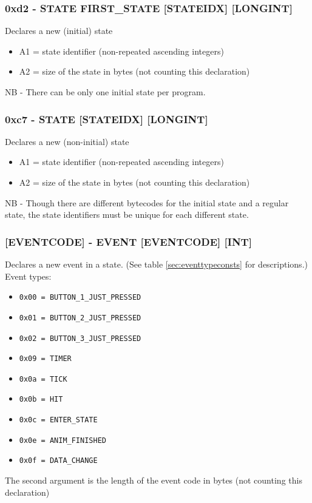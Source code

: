 \documentclass[12pt,a4paper]{scrbook}
\begin{document}
\subsubsection{0xd2 - STATE FIRST\_STATE [STATEIDX] [LONGINT]}
Declares a new (initial) state
\begin{itemize}
\item A1 = state identifier (non-repeated ascending integers)
\item A2 = size of the state in bytes (not counting this declaration)
\end{itemize}
NB - There can be only one initial state per program.

\subsubsection{0xc7 - STATE [STATEIDX] [LONGINT]}
Declares a new (non-initial) state
\begin{itemize}
\item A1 = state identifier (non-repeated ascending integers)
\item A2 = size of the state in bytes (not counting this declaration)
\end{itemize}
NB - Though there are different bytecodes for the initial state and a regular state,
the state identifiers must be unique for each different state.

\subsubsection{[EVENTCODE] - EVENT [EVENTCODE] [INT]}
Declares a new event in a state.  (See table \ref{sec:eventtypeconsts} for descriptions.)
Event types:
\begin{itemize}
\item \texttt{0x00 = BUTTON\_1\_JUST\_PRESSED}
\item \texttt{0x01 = BUTTON\_2\_JUST\_PRESSED}
\item \texttt{0x02 = BUTTON\_3\_JUST\_PRESSED}
\item \texttt{0x09 = TIMER}
\item \texttt{0x0a = TICK}
\item \texttt{0x0b = HIT}
\item \texttt{0x0c = ENTER\_STATE}
\item \texttt{0x0e = ANIM\_FINISHED}
\item \texttt{0x0f = DATA\_CHANGE}
\end{itemize}
The second argument is the length of the event code in bytes (not counting this declaration)
\end{document}
